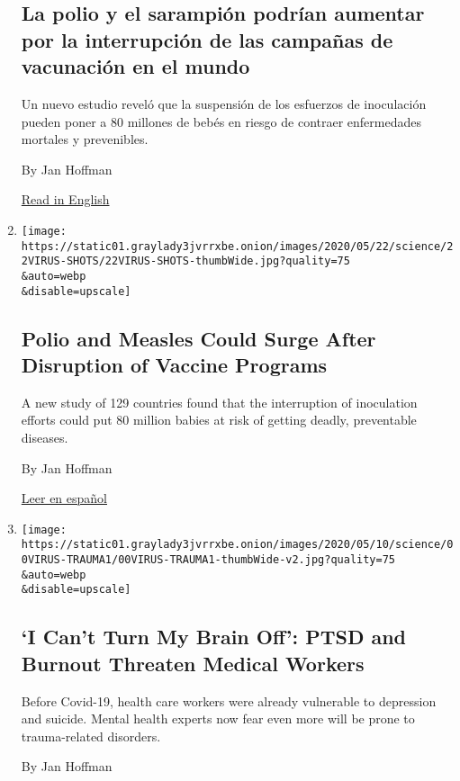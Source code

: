 \begin{enumerate}
{  \subsection{La polio y el sarampión podrían aumentar por la
  interrupción de las campañas de vacunación en el
  mundo}\label{la-polio-y-el-sarampiuxf3n-podruxedan-aumentar-por-la-interrupciuxf3n-de-las-campauxf1as-de-vacunaciuxf3n-en-el-mundo}}

  Un nuevo estudio reveló que la suspensión de los esfuerzos de
  inoculación pueden poner a 80 millones de bebés en riesgo de contraer
  enfermedades mortales y prevenibles.

  By Jan Hoffman

  \href{https://www.nytimes3xbfgragh.onion/2020/05/22/health/coronavirus-polio-measles-immunizations.html}{Read
  in English}
\item
  \href{/2020/05/22/health/coronavirus-polio-measles-immunizations.html}{}

  \texttt{[image: https://static01.graylady3jvrrxbe.onion/images/2020/05/22/science/22VIRUS-SHOTS/22VIRUS-SHOTS-thumbWide.jpg?quality=75\\\&auto=webp\\\&disable=upscale]}

  \hypertarget{polio-and-measles-could-surge-after-disruption-of-vaccine-programs}{%
  \subsection{Polio and Measles Could Surge After Disruption of Vaccine
  Programs}\label{polio-and-measles-could-surge-after-disruption-of-vaccine-programs}}

  A new study of 129 countries found that the interruption of
  inoculation efforts could put 80 million babies at risk of getting
  deadly, preventable diseases.

  By Jan Hoffman

  \href{https://www.nytimes3xbfgragh.onion/es/2020/05/25/espanol/ciencia-y-tecnologia/vacuna-polio-sarampion-coronavirus.html}{Leer
  en español}
\item
  \href{/2020/05/16/health/coronavirus-ptsd-medical-workers.html}{}

  \texttt{[image: https://static01.graylady3jvrrxbe.onion/images/2020/05/10/science/00VIRUS-TRAUMA1/00VIRUS-TRAUMA1-thumbWide-v2.jpg?quality=75\\\&auto=webp\\\&disable=upscale]}

  \hypertarget{i-cant-turn-my-brain-off-ptsd-and-burnout-threaten-medical-workers}{%
  \subsection{`I Can't Turn My Brain Off': PTSD and Burnout Threaten
  Medical
  Workers}\label{i-cant-turn-my-brain-off-ptsd-and-burnout-threaten-medical-workers}}

  Before Covid-19, health care workers were already vulnerable to
  depression and suicide. Mental health experts now fear even more will
  be prone to trauma-related disorders.

  By Jan Hoffman
\end{enumerate}

